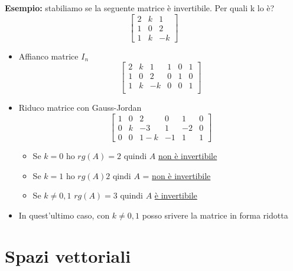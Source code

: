 \textbf{Esempio:}
stabiliamo se la seguente matrice è invertibile. Per quali k lo è?
\[
	\begin{bmatrix}
		2 & k & 1  \\
		1 & 0 & 2  \\
		1 & k & -k
	\end{bmatrix}
\]
\begin{itemize}
	\item Affianco matrice $I_n$
	      \[
		      \begin{bmatrix}
			      2 & k & 1  & 1 & 0 & 1 \\
			      1 & 0 & 2  & 0 & 1 & 0 \\
			      1 & k & -k & 0 & 0 & 1 \\
		      \end{bmatrix}
	      \]
	\item Riduco matrice con Gauss-Jordan
	      \[
		      \begin{bmatrix}
			      1 & 0 & 2   & 0  & 1  & 0 \\
			      0 & k & -3  & 1  & -2 & 0 \\
			      0 & 0 & 1-k & -1 & 1  & 1
		      \end{bmatrix}
	      \]
	      \begin{itemize}
		      \item Se $k=0$ ho $rg\left( A \right) =2$ quindi $A$ \underline{non è invertibile}
		      \item Se $k=1$ ho $rg\left( A \right) 2$ qindi $A$ = \underline{non è invertibile}
		      \item Se $k \neq 0,1$ $rg\left( A \right) =3$ quindi $A$ \underline{è invertibile}
	      \end{itemize}
	\item In quest'ultimo caso, con $k \neq 0,1$ posso srivere la matrice in forma ridotta
\end{itemize}
\section{Spazi vettoriali}

